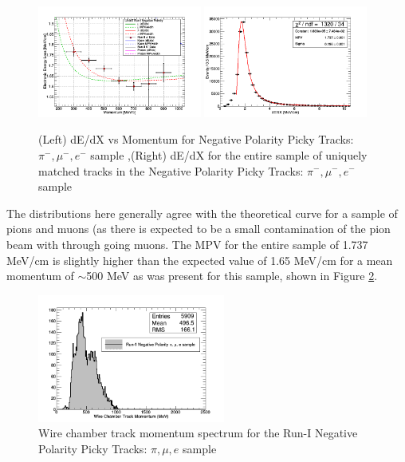 \begin{figure}[htb]
\centering
\includegraphics[width=0.48\textwidth]{images/dEdXvsMomentumNegPolRun1FineBin2.png}
\includegraphics[width=0.48\textwidth]{images/dEdXRun1NegPolFinal.png}
\caption{(Left) dE/dX vs Momentum for Negative Polarity Picky Tracks: $\pi^{-}, \mu^{-}, e^{-}$ sample ,(Right) dE/dX for the entire sample of uniquely matched tracks in the Negative Polarity Picky Tracks: $\pi^{-}, \mu^{-}, e^{-}$ sample }
\label{fig:Run1NegPickyTrkPiMuEResults}
\end{figure}

The distributions here generally agree with the theoretical curve for a sample of pions and muons (as there is expected to be a small contamination of the pion beam with through going muons. The MPV for the entire sample of 1.737 MeV/cm is slightly higher than the expected value of 1.65 MeV/cm for a mean momentum of $\sim$500 MeV as was present for this sample, shown in Figure \ref{fig:Run1NegPickyTrkPiMuEMomentumSpec}.

\begin{figure}[htb]
\centering
\includegraphics[width=0.55\textwidth]{images/WCTrkMomentumRun1NegPiMuE.png}
\caption{Wire chamber track momentum spectrum for the Run-I Negative Polarity Picky Tracks: $\pi, \mu, e$ sample  }
\label{fig:Run1NegPickyTrkPiMuEMomentumSpec}
\end{figure}

